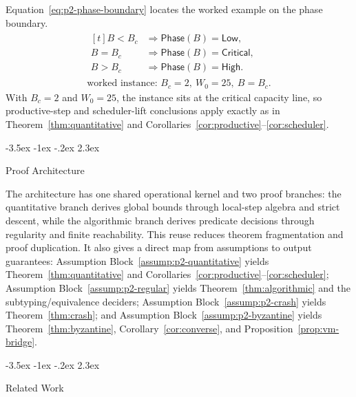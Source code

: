 \documentclass[a4paper,10pt,twocolumn,english]{article}
\makeatletter
\renewcommand{\section}{\@startsection{section}{1}{\z@}%
  {-3.5ex \@plus -1ex \@minus -.2ex}%
  {2.3ex}%
  {\raggedright\normalfont\large\bfseries}}
\numberwithin{equation}{section}
\theoremstyle{paperdef}
\theoremstyle{paperplain}
\theoremstyle{paperdef}
\theoremstyle{paperremark}
\newcommand{\Bc}{\ensuremath{B_c}}
\newcommand{\Phase}{\ensuremath{\mathsf{Phase}}}
\makeatother
\begin{document}
Equation~\ref{eq:p2-phase-boundary} locates the worked example on the phase boundary.
\begin{equation}
	\label{eq:p2-phase-boundary}
	\begin{array}{c}
		\begin{aligned}[t]
			B<\Bc & \Rightarrow \Phase(B)=\mathsf{Low},      \\
			B=\Bc & \Rightarrow \Phase(B)=\mathsf{Critical}, \\
			B>\Bc & \Rightarrow \Phase(B)=\mathsf{High}.
		\end{aligned}
		\\[2pt]
		\text{worked instance: } \Bc=2,\ W_0=25,\ B=\Bc.
	\end{array}
\end{equation}
With $\Bc=2$ and $W_0=25$, the instance sits at the critical capacity line, so productive-step and scheduler-lift conclusions apply exactly as in Theorem~\ref{thm:quantitative} and Corollaries~\ref{cor:productive}--\ref{cor:scheduler}.

\section{Proof Architecture}
\label{sec:architecture}

The architecture has one shared operational kernel and two proof branches: the quantitative branch derives global bounds through local-step algebra and strict descent, while the algorithmic branch derives predicate decisions through regularity and finite reachability. This reuse reduces theorem fragmentation and proof duplication. It also gives a direct map from assumptions to output guarantees: Assumption Block~\ref{assump:p2-quantitative} yields Theorem~\ref{thm:quantitative} and Corollaries~\ref{cor:productive}--\ref{cor:scheduler}; Assumption Block~\ref{assump:p2-regular} yields Theorem~\ref{thm:algorithmic} and the subtyping/equivalence deciders; Assumption Block~\ref{assump:p2-crash} yields Theorem~\ref{thm:crash}; and Assumption Block~\ref{assump:p2-byzantine} yields Theorem~\ref{thm:byzantine}, Corollary~\ref{cor:converse}, and Proposition~\ref{prop:vm-bridge}.

\section{Related Work}
\label{sec:related}
\end{document}

